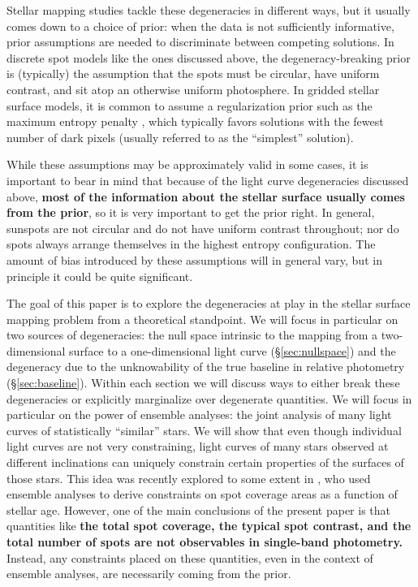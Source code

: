 \documentclass[modern]{aastex62}
\begin{document}
Stellar mapping studies tackle these degeneracies in different ways, but
it usually comes down to a choice of prior: when the data is not
sufficiently informative, prior assumptions are needed to discriminate
between competing solutions. In discrete spot models like the ones
discussed above, the degeneracy-breaking prior is (typically) the assumption that the
spots must be circular, have uniform contrast, and sit atop an otherwise
uniform photosphere. In gridded stellar surface models, it is common to
assume a regularization prior such as the maximum entropy penalty
\citep[e.g.,][]{Vogt1987}, which typically favors solutions with the fewest
number of dark pixels (usually referred to as the ``simplest'' solution).

While these assumptions may be approximately valid in some cases, it is
important to bear in mind that because of the light curve degeneracies discussed above,
\textbf{most of the information about the stellar surface usually comes from the prior},
so it is very important to get the
prior right. In general, sunspots are not circular and do not have uniform
contrast throughout; nor do spots always arrange themselves in the highest
entropy configuration. The amount of bias introduced by these assumptions
will in general vary, but in principle it could be quite significant.


The goal of this paper is to explore the degeneracies at play in the
stellar surface mapping problem from a theoretical standpoint.
We will focus in particular on two sources of degeneracies: the
null space intrinsic to the mapping from a two-dimensional surface to
a one-dimensional light curve (\S\ref{sec:nullspace})
and the degeneracy due to the unknowability of the true baseline in
relative photometry (\S\ref{sec:baseline}). Within each section we
will discuss ways to either break these degeneracies or explicitly marginalize
over degenerate quantities.
We will focus in particular on the power of ensemble analyses: the
joint analysis of many light curves of statistically ``similar''
stars. We will show that even though individual light curves are not very
constraining, light curves of many stars
observed at different inclinations can uniquely constrain certain
properties of the surfaces of those stars.
%
This idea was recently explored to some extent
in \citet{Morris2020}, who used ensemble analyses to derive constraints on
spot coverage areas as a function of stellar age. However, one of
the main conclusions of the present paper is that
quantities like \textbf{the
    total spot coverage, the typical spot contrast, and the total number of
    spots are not observables in single-band photometry.} Instead,
any constraints placed on these quantities, even in the context of
ensemble analyses, are necessarily coming from the prior.
\end{document}
